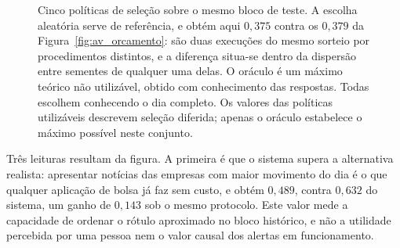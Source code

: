 \begin{figure}[htbp]
\centering
{}
\caption[O sistema contra as alternativas já disponíveis]{Cinco políticas de seleção sobre o mesmo
bloco de teste. A escolha aleatória serve de referência, e obtém aqui $0{,}375$ contra os
$0{,}379$ da Figura~\ref{fig:av_orcamento}: são duas execuções do mesmo sorteio por
procedimentos distintos, e a diferença situa-se dentro da dispersão entre sementes de
qualquer uma delas. O oráculo é um máximo teórico não utilizável,
obtido com conhecimento das respostas. Todas escolhem conhecendo o dia
completo. Os valores das políticas utilizáveis descrevem seleção diferida; apenas o oráculo
estabelece o máximo possível neste conjunto.}
\label{fig:av_pontaaponta}
\end{figure}

Três leituras resultam da figura. A primeira é que o sistema supera a alternativa realista: apresentar
notícias das empresas com maior movimento do dia é o que qualquer aplicação de bolsa já faz sem
custo, e obtém $0{,}489$, contra $0{,}632$ do sistema, um ganho de $0{,}143$ sob o mesmo protocolo.
Este valor mede a capacidade de ordenar o rótulo aproximado no bloco histórico, e não a utilidade
percebida por uma pessoa nem o valor causal dos alertas em funcionamento.

